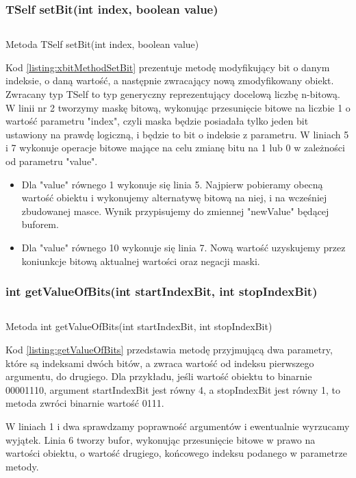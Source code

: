 \subsubsection{TSelf setBit(int index, boolean value)}
\begin{listing}[h]
	\inputminted{java}{listings/xbit/xbitMethodSetBit.java}
	\caption{Metoda TSelf setBit(int index, boolean value)}
	\label{listing:xbitMethodSetBit}
\end{listing}	
Kod \ref{listing:xbitMethodSetBit} prezentuje metodę modyfikujący bit o danym indeksie, o daną wartość, a następnie zwracający nową zmodyfikowany obiekt. Zwracany typ TSelf to typ generyczny reprezentujący docelową liczbę n-bitową. W linii nr 2 tworzymy maskę bitową, wykonując przesunięcie bitowe na liczbie 1 o wartość parametru "index", czyli maska będzie posiadała tylko jeden bit ustawiony na prawdę logiczną, i będzie to bit o indeksie z parametru. W liniach 5 i 7 wykonuje operacje bitowe mające na celu zmianę bitu na 1 lub 0 w zależności od parametru "value". 
\begin{itemize}  
	\item Dla "value" równego 1 wykonuje się linia 5. Najpierw pobieramy obecną wartość obiektu i wykonujemy alternatywę bitową na niej, i na wcześniej zbudowanej masce. Wynik przypisujemy do zmiennej "newValue" będącej buforem.
	\item Dla "value" równego 10 wykonuje się linia 7. Nową wartość uzyskujemy przez koniunkcje bitową aktualnej wartości oraz negacji maski. 
\end{itemize} 

\subsubsection{int getValueOfBits(int startIndexBit, int stopIndexBit)}
\begin{listing}[h]
	\inputminted{java}{listings/xbit/getValueOfBits.java}
	\caption{Metoda int getValueOfBits(int startIndexBit, int stopIndexBit)}
	\label{listing:getValueOfBits}
\end{listing}
Kod \ref{listing:getValueOfBits} przedstawia metodę przyjmującą dwa parametry, które są indeksami dwóch bitów, a zwraca wartość od indeksu pierwszego argumentu, do drugiego. Dla przykładu, jeśli wartość obiektu to binarnie 00001110, argument startIndexBit jest równy 4, a stopIndexBit jest równy 1, to metoda zwróci binarnie wartość 0111.

W liniach 1 i dwa sprawdzamy poprawność argumentów i ewentualnie wyrzucamy wyjątek.  Linia 6 tworzy bufor, wykonując przesunięcie bitowe w prawo na wartości obiektu, o wartość drugiego, końcowego indeksu podanego w parametrze metody.

